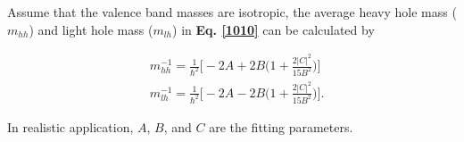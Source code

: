 \documentclass[a4paper, 12pt, titlepage,oneside,drop]{kthesis}
\begin{document}
Assume that the valence band masses are isotropic, the average heavy hole mass ($m_{hh}$) and light hole mass ($m_{lh}$) in \textbf{Eq. \ref{1010}} can be calculated by 

\begin{equation}\begin{split}
&  m_{hh}^{-1} = \frac{1}{\hbar^2} \Big[ -2A + 2B \big(1+ \frac{2|C|^2}{15B^2}\big)\Big] \\
&  m_{lh}^{-1} = \frac{1}{\hbar^2} \Big[ -2A - 2B \big(1+ \frac{2|C|^2}{15B^2}\big)\Big].
 \end{split}
\end{equation}


In realistic application, $A$, $B$, and $C$ are the fitting parameters.
\end{document}

